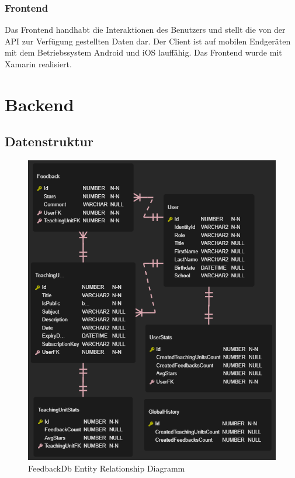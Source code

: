 \subsubsection{Frontend}
Das Frontend handhabt die Interaktionen des Benutzers und stellt die von der API zur Verfügung gestellten Daten dar. Der Client ist auf mobilen Endgeräten 
mit dem Betriebssystem Android und iOS lauffähig. Das Frontend wurde mit Xamarin realisiert.

\section{Backend}
\subsection{Datenstruktur}

\begin{figure}[h]
    \begin{center}
        \includegraphics*[width=12cm]{./pics/FeedbackDb-ERD.png}
    \caption[ERD FeedbackDb]{FeedbackDb Entity Relationship Diagramm}
    \end{center} 
\end{figure}

